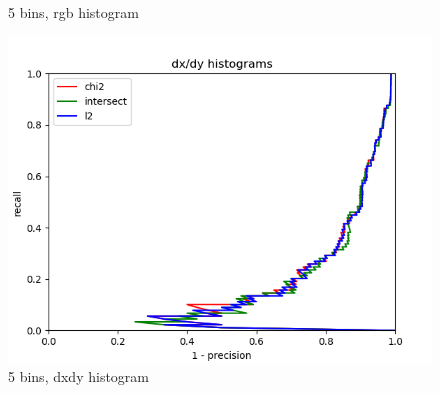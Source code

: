 \documentclass{article}
\begin{document}
\begin{figure}[ht]
\begin{minipage}{.5\textwidth}
        \caption{5 bins, rgb histogram}
    \end{minipage}
    \begin{minipage}{.5\textwidth}
        \includegraphics[width=\linewidth]{images/Q4.b-dxdy_histogram_5_bins.png}
        \caption{5 bins, dxdy histogram}
    \end{minipage}
\end{figure}
\end{document}
